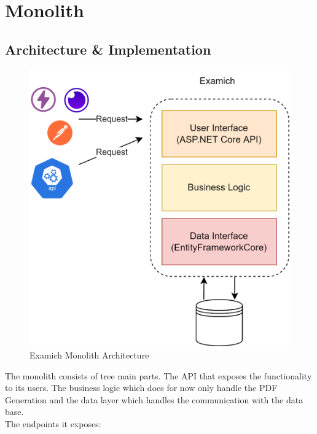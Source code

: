 \documentclass[BIF,Master,nenglish]{twbook}%
\begin{document}
\section{Monolith}

\subsection{Architecture \& Implementation}

\begin{figure} [H]
 \begin{center}
    \includegraphics[width=0.6\linewidth]{img/ExamichMonolith.png}
 \end{center}
 \caption{Examich Monolith Architecture}
 \label{examichMonolith}
\end{figure}

The monolith consists of tree main parts. The API that exposes the functionality to its users. The business logic which does for now only handle the PDF Generation and the data layer which handles the communication with the data base.
\\
\noindent
The endpoints it exposes:
\end{document}
